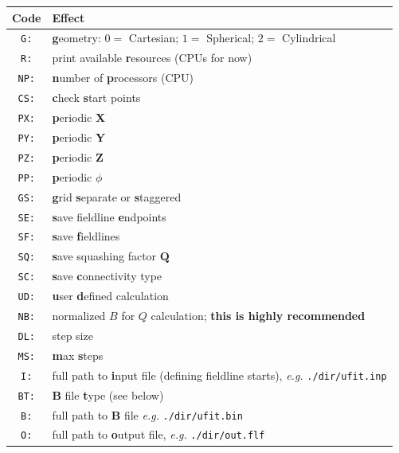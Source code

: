 \documentclass[12pt,twoside]{article}
\begin{document}
\begin{tabular}{|c|l|}		
		\hline
		\textbf{Code} & \textbf{Effect} \\\hline\hline
		\texttt{G:} & \textbf{g}eometry: $0 =$ Cartesian; $1 =$ Spherical; $2 =$ Cylindrical  \\\hline
		\texttt{R:} & print available \textbf{r}esources (CPUs for now) \\\hline
		\texttt{NP:} &  \textbf{n}umber of \textbf{p}rocessors (CPU) \\\hline
		\texttt{CS:} & \textbf{c}heck \textbf{s}tart points \\\hline
		\texttt{PX:} & \textbf{p}eriodic \textbf{X} \\\hline
		\texttt{PY:} & \textbf{p}eriodic \textbf{Y}  \\\hline
		\texttt{PZ:} & \textbf{p}eriodic \textbf{Z}  \\\hline
		\texttt{PP:} & \textbf{p}eriodic $\phi$  \\\hline
		\texttt{GS:} & \textbf{g}rid \textbf{s}eparate or \textbf{s}taggered  \\\hline
		\texttt{SE:} & \textbf{s}ave fieldline \textbf{e}ndpoints \\\hline
		\texttt{SF:} & \textbf{s}ave \textbf{f}ieldlines \\\hline
		\texttt{SQ:} & \textbf{s}ave squashing factor $\mathbf{Q}$  \\\hline
		\texttt{SC:} & \textbf{s}ave \textbf{c}onnectivity type  \\\hline
		\texttt{UD:} & \textbf{u}ser \textbf{d}efined calculation  \\\hline
		\texttt{NB:} & normalized $B$ for $Q$ calculation; \textbf{this is highly recommended} \\\hline
		\texttt{DL:} & step size \\\hline
		\texttt{MS:} & \textbf{m}ax \textbf{s}teps  \\\hline
		\texttt{I:} & full path to \textbf{i}nput file (defining fieldline starts), \textit{e.g.} \texttt{./dir/ufit.inp} \\\hline
		\texttt{BT:} & $\mathbf{B}$ file \textbf{t}ype (see below) \\\hline
		\texttt{B:} & full path to $\mathbf{B}$ file \textit{e.g.} \texttt{./dir/ufit.bin} \\\hline
		\texttt{O:} & full path to \textbf{o}utput file, \textit{e.g.} \texttt{./dir/out.flf} \\\hline

\end{tabular}
\end{document}
